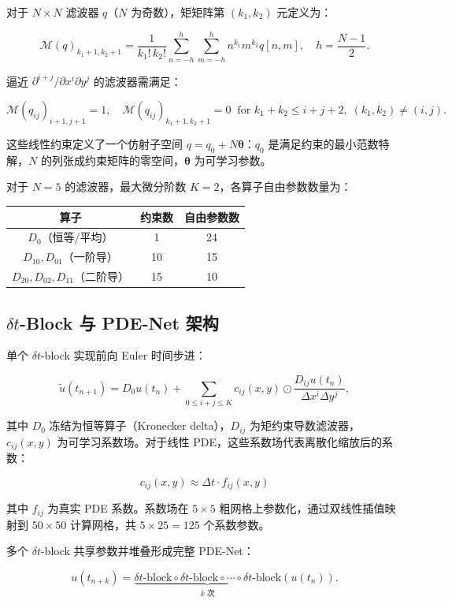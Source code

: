 \documentclass[11pt,a4paper]{article}
\begin{document}
对于 $N\times N$ 滤波器 $q$（$N$ 为奇数），矩矩阵第 $(k_1,k_2)$ 元定义为：

\[
\mathcal{M}(q)_{k_1+1,k_2+1} = \frac{1}{k_1!\,k_2!} \sum_{n=-h}^{h} \sum_{m=-h}^{h} n^{k_1} m^{k_2} q[n,m], \quad h = \frac{N-1}{2}.
\]

逼近 $\partial^{i+j}/\partial x^i \partial y^j$ 的滤波器需满足：

\[
\mathcal{M}(q_{ij})_{i+1,j+1} = 1, \quad \mathcal{M}(q_{ij})_{k_1+1,k_2+1} = 0 \;\; \text{for } k_1+k_2 \leq i+j+2,\;(k_1,k_2)\neq (i,j).
\]

这些线性约束定义了一个仿射子空间 $q = q_0 + N\bm{\theta}$：$q_0$ 是满足约束的最小范数特解，$N$ 的列张成约束矩阵的零空间，$\bm{\theta}$ 为可学习参数。

对于 $N=5$ 的滤波器，最大微分阶数 $K=2$，各算子自由参数数量为：

\begin{center}
\begin{tabular}{ccc}
\toprule
算子 & 约束数 & 自由参数数 \\
\midrule
$D_0$（恒等/平均） & 1 & 24 \\
$D_{10}, D_{01}$（一阶导） & 10 & 15 \\
$D_{20}, D_{02}, D_{11}$（二阶导） & 15 & 10 \\
\bottomrule
\end{tabular}
\end{center}

\subsection{$\delta t$-Block 与 PDE-Net 架构}

单个 $\delta t$-block 实现前向 Euler 时间步进：

\[
\tilde{u}(t_{n+1}) = D_0 u(t_n) + \sum_{0 \leq i+j \leq K} c_{ij}(x,y) \odot \frac{D_{ij}u(t_n)}{\Delta x^i \Delta y^j},
\]

其中 $D_0$ 冻结为恒等算子（Kronecker delta），$D_{ij}$ 为矩约束导数滤波器，$c_{ij}(x,y)$ 为可学习系数场。对于线性 PDE，这些系数场代表离散化缩放后的系数：

\[
c_{ij}(x,y) \approx \Delta t \cdot f_{ij}(x,y)
\]

其中 $f_{ij}$ 为真实 PDE 系数。系数场在 $5\times5$ 粗网格上参数化，通过双线性插值映射到 $50\times50$ 计算网格，共 $5 \times 25 = 125$ 个系数参数。

多个 $\delta t$-block 共享参数并堆叠形成完整 PDE-Net：

\[
u(t_{n+k}) = \underbrace{\delta t\text{-block} \circ \delta t\text{-block} \circ \cdots \circ \delta t\text{-block}}_{k \text{ 次}} (u(t_n)).
\]
\end{document}
